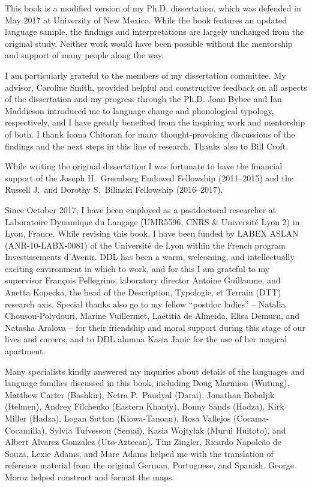 \addchap{\lsAcknowledgementTitle} 

This book is a modified version of my Ph.D. dissertation, which was defended in May 2017 at University of New Mexico. While the book features an updated language sample, the findings and interpretations are largely unchanged from the original study. Neither work would have been possible without the mentorship and support of many people along the way.

I am particularly grateful to the members of my dissertation committee. My advisor, Caroline Smith, provided helpful and constructive feedback on all aspects of the dissertation and my progress through the Ph.D. Joan Bybee and Ian Maddieson introduced me to language change and phonological typology, respectively, and I have greatly benefited from the inspiring work and mentorship of both. I thank Ioana Chitoran for many thought-provoking discussions of the findings and the next steps in this line of research. Thanks also to Bill Croft.

While writing the original dissertation I was fortunate to have the financial support of the Joseph H.\ Greenberg Endowed Fellowship (2011--2015) and the Russell J.\ and Dorothy S.\ Bilinski Fellowship (2016--2017).

Since October 2017, I have been employed as a postdoctoral researcher at Laboratoire Dynamique du Langage (UMR5596, CNRS \& Université Lyon 2) in Lyon, France. While revising this book, I have been funded by LABEX ASLAN (ANR-10-LABX-0081) of the Université de Lyon within the French program Investissements d’Avenir. DDL has been a warm, welcoming, and intellectually exciting environment in which to work, and for this I am grateful to my supervisor François Pellegrino, laboratory director Antoine Guillaume, and Anetta Kopecka, the head of the Description, Typologie, et Terrain (DTT) research axis. Special thanks also go to my fellow ``postdoc ladies'' -- Natalia Chousou-Polydouri, Marine Vuillermet, Laetitia de Almeida, Elisa Demuru, and Natasha Aralova -- for their friendship and moral support during this stage of our lives and careers, and to DDL alumna Kasia Janic for the use of her magical apartment.

Many specialists kindly answered my inquiries about details of the languages and language families discussed in this book, including Doug Marmion (Wutung), Matthew Carter (Bashkir), Netra P.\ Paudyal (Darai), Jonathan Bobaljik (Itelmen), Andrey Filchenko (Eastern Khanty), Bonny Sands (Hadza), Kirk Miller (Hadza), Logan Sutton (Kiowa-Tanoan), Rosa Vallejos (Cocama-Cocamilla), Sylvia Tufvesson (Semai), Kasia Wojtylak (Murui Huitoto), and Albert Alvarez Gonzalez (Uto-Aztecan). Tim Zingler, Ricardo Napoleão de Souza, Lexie Adams, and Marc Adams helped me with the translation of reference material from the original German, Portuguese, and Spanish. George Moroz helped construct and format the maps.

